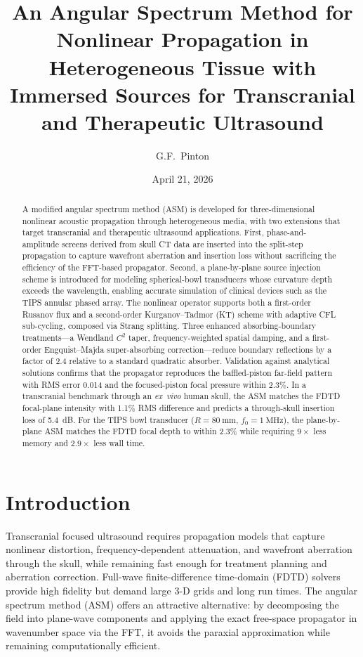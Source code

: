 \documentclass[11pt]{article}
\title{An Angular Spectrum Method for Nonlinear Propagation in
Heterogeneous Tissue with Immersed Sources for Transcranial and
Therapeutic Ultrasound}
\author{G.F.\ Pinton}
\date{April 21, 2026}
\begin{document}
\maketitle

\begin{abstract}
A modified angular spectrum method (ASM) is developed for
three-dimensional nonlinear acoustic propagation through heterogeneous
media, with two extensions that target transcranial and therapeutic
ultrasound applications.  First, phase-and-amplitude screens derived
from skull CT data are inserted into the split-step propagation to
capture wavefront aberration and insertion loss without sacrificing
the efficiency of the FFT-based propagator.  Second, a plane-by-plane
source injection scheme is introduced for modeling spherical-bowl
transducers whose curvature depth exceeds the wavelength, enabling
accurate simulation of clinical devices such as the TIPS annular
phased array.  The nonlinear operator supports both a first-order
Rusanov flux and a second-order Kurganov--Tadmor (KT) scheme with
adaptive CFL sub-cycling, composed via Strang splitting.  Three
enhanced absorbing-boundary treatments---a Wendland $C^2$ taper,
frequency-weighted spatial damping, and a first-order Engquist--Majda
super-absorbing correction---reduce boundary reflections by a factor
of 2.4 relative to a standard quadratic absorber.  Validation against
analytical solutions confirms that the propagator reproduces the
baffled-piston far-field pattern with RMS error 0.014 and the
focused-piston focal pressure within 2.3\%.  In a transcranial
benchmark through an \emph{ex~vivo} human skull, the ASM matches the
FDTD focal-plane intensity with 1.1\% RMS difference and predicts a
through-skull insertion loss of \SI{5.4}{\deci\bel}.  For the TIPS
bowl transducer ($R = \SI{80}{\milli\meter}$,
$f_0 = \SI{1}{\mega\hertz}$), the plane-by-plane ASM matches the FDTD
focal depth to within 2.3\% while requiring $9\times$ less memory and
$2.9\times$ less wall time.
\end{abstract}

\section{Introduction}
\label{sec:intro}

Transcranial focused ultrasound requires propagation models that
capture nonlinear distortion, frequency-dependent attenuation, and
wavefront aberration through the skull, while remaining fast enough
for treatment planning and aberration correction.  Full-wave
finite-difference time-domain (FDTD) solvers
\cite{pinton2009,pinton2014} provide high fidelity but demand large
3-D grids and long run times.  The angular spectrum method (ASM)
\cite{christopher1991,du1985,zemp2010} offers an attractive
alternative: by decomposing the field into plane-wave components and
applying the exact free-space propagator in wavenumber space via the
FFT, it avoids the paraxial approximation while remaining
computationally efficient.
\end{document}
